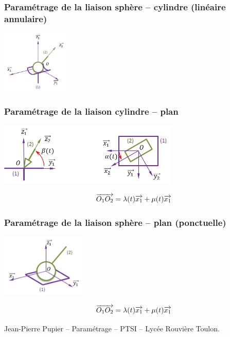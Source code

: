 \documentclass[10pt,oneside]{article}
\begin{document}
\subsubsection{Paramétrage de la liaison sphère -- cylindre (linéaire annulaire)}
\begin{minipage}[c]{.3\linewidth}
\begin{center}
\includegraphics[height=3cm]{png/annulaire_3d}
\end{center}
\end{minipage} \hfill
\begin{minipage}[c]{.65\linewidth}

\end{minipage}

\subsubsection{Paramétrage de la liaison cylindre -- plan}
\begin{minipage}[c]{.3\linewidth}
\begin{center}
\includegraphics[height=3cm]{png/rectiligne_p}
\end{center}
\end{minipage} \hfill
\begin{minipage}[c]{.65\linewidth}
$$
\overrightarrow{O_1 O_2} = \lambda(t) \overrightarrow{x_1} + \mu(t) \overrightarrow{x_1}
$$
\end{minipage}

\subsubsection{Paramétrage de la liaison sphère -- plan (ponctuelle)}
\begin{minipage}[c]{.3\linewidth}
\begin{center}
\includegraphics[height=3cm]{png/ponctuelle_3d}
\end{center}
\end{minipage} \hfill
\begin{minipage}[c]{.65\linewidth}
$$
\overrightarrow{O_1 O_2} = \lambda(t) \overrightarrow{x_1} + \mu(t) \overrightarrow{x_1}
$$
\end{minipage}



\begin{thebibliography}{2}
 Jean-Pierre Pupier -- Paramétrage -- PTSI -- Lycée Rouvière Toulon.
\end{thebibliography}
\end{document}
